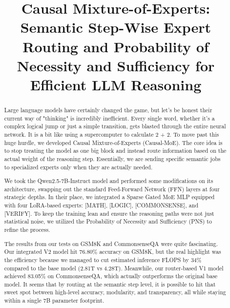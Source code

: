 \documentclass[conference,compsoc]{IEEEtran}
\begin{document}
\title{Causal Mixture-of-Experts: Semantic Step-Wise Expert Routing and Probability of Necessity and Sufficiency for Efficient LLM Reasoning}

\author{
}

\maketitle

\begin{abstract}
Large language models have certainly changed the game, but let’s be honest their current way of "thinking" is incredibly inefficient. Every single word, whether it’s a complex logical jump or just a simple transition, gets blasted through the entire neural network. It is a bit like using a supercomputer to calculate 2 + 2. To move past this huge hurdle, we developed Causal Mixture-of-Experts (Causal-MoE). The core idea is to stop treating the model as one big block and instead route information based on the actual weight of the reasoning step. Essentially, we are sending specific semantic jobs to specialized experts only when they are actually needed.

We took the Qwen2.5-7B-Instruct model and performed some modifications on its architecture, swapping out the standard Feed-Forward Network (FFN) layers at four strategic depths. In their place, we integrated a Sparse Gated MoE MLP equipped with four LoRA-based experts: [MATH], [LOGIC], [COMMONSENSE], and [VERIFY]. To keep the training lean and ensure the reasoning paths were not just statistical noise, we utilized the Probability of Necessity and Sufficiency (PNS) to refine the process.

The results from our tests on GSM8K and CommonsenseQA were quite fascinating. Our integrated V2 model hit 76.80\% accuracy on GSM8K, but the real highlight was the efficiency because we managed to cut estimated inference FLOPS by 34\% compared to the base model (2.81T vs 4.28T). Meanwhile, our router-based V1 model achieved 83.05\% on CommonsenseQA, which actually outperforms the original base model. It seems that by routing at the semantic step level, it is possible to hit that sweet spot between high-level accuracy, modularity, and transparency, all while staying within a single 7B parameter footprint.
\end{abstract}
\end{document}
